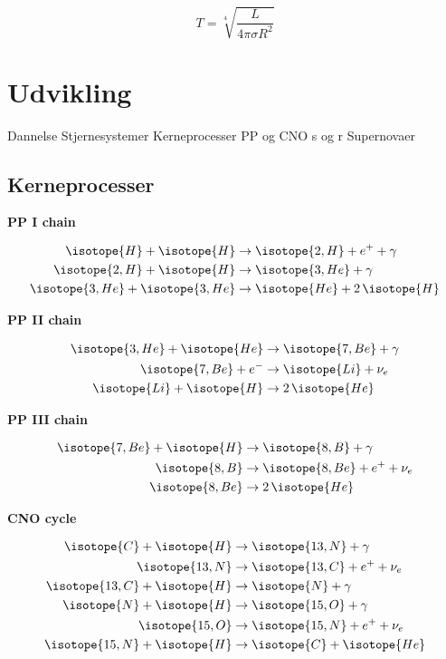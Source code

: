\documentclass[crop=false, class=memoir]{standalone}
\begin{document}
\begin{equation}
    T = \sqrt[4]{\frac{L}{4\pi\sigma R^2}}
\end{equation}

\section{Udvikling}
Dannelse
Stjernesystemer
Kerneprocesser
PP og CNO
s og r
Supernovaer

\subsection{Kerneprocesser}

\textbf{PP I chain} \cite{CarrolOstlieModernAstrophysics2017}
    
\begin{align}
    \isotope{H} + \isotope{H} &\rightarrow \isotope{2,H} + e^+ + \gamma\\
    \isotope{2,H} + \isotope{H} &\rightarrow \isotope{3,He} + \gamma\\
    \isotope{3,He} + \isotope{3,He} &\rightarrow \isotope{He} + 2\, \isotope{H}
\end{align}
    
\textbf{PP II chain}
    
\begin{align}
    \isotope{3,He} + \isotope{He} &\rightarrow \isotope{7,Be} + \gamma\\
    \isotope{7,Be} + e^- &\rightarrow \isotope{Li} + \nu_e\\
    \isotope{Li} + \isotope{H} &\rightarrow 2\, \isotope{He}
\end{align}
    
\textbf{PP III chain}

\begin{align}
    \isotope{7,Be} + \isotope{H} &\rightarrow \isotope{8,B} + \gamma\\
    \isotope{8,B} &\rightarrow \isotope{8,Be} + e^+ + \nu_e\\
    \isotope{8,Be} &\rightarrow 2\, \isotope{He}
\end{align}
    
\textbf{CNO cycle}
    
\begin{align}
    \isotope{C} + \isotope{H} &\rightarrow \isotope{13,N} + \gamma\\
    \isotope{13,N} &\rightarrow \isotope{13,C} + e^+ + \nu_e\\
    \isotope{13,C} + \isotope{H} &\rightarrow \isotope{N} + \gamma\\
    \isotope{N} + \isotope{H} &\rightarrow \isotope{15,O} + \gamma\\
    \isotope{15,O} &\rightarrow \isotope{15,N} + e^+ + \nu_e\\
    \isotope{15,N} + \isotope{H} &\rightarrow \isotope{C} + \isotope{He}
\end{align}
\end{document}
